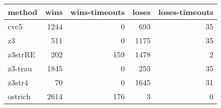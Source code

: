 \begin{tabular}{lrrrr}
\hline
 method   &   wins &   wins-timeouts &   loses &   loses-timeouts \\
\hline
 cvc5     &   1244 &               0 &     693 &               35 \\
 z3       &    511 &               0 &    1175 &               35 \\
 z3strRE  &    202 &             159 &    1478 &                2 \\
 z3-trau  &   1845 &               0 &     253 &               35 \\
 z3str4   &     70 &               0 &    1645 &               31 \\
 ostrich  &   2614 &             176 &       3 &                0 \\
\hline
\end{tabular}
